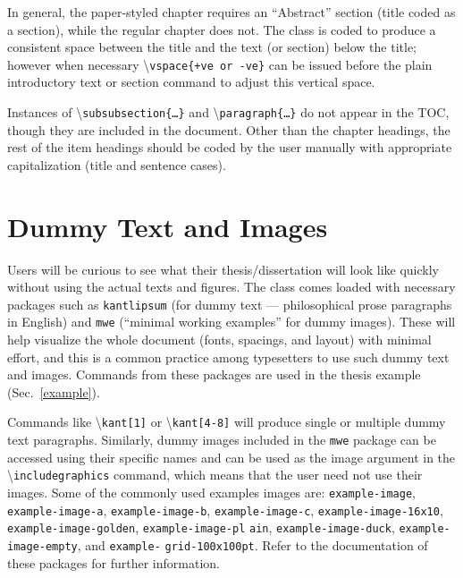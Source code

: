\documentclass{article}
\newcommand\cmd[1]{\textbackslash\texttt{#1}}
\begin{document}
In general,  the paper-styled chapter requires an ``Abstract'' section (title coded as a section),  while the regular chapter does not.  The class is coded to produce a consistent space between the title and the text (or section) below the title; however when necessary \cmd{vspace\{+ve or -ve\}} can be issued before the plain introductory text or section command to adjust this vertical space.  

Instances of \cmd{subsubsection\{\ldots\}} and \cmd{paragraph\{\ldots\}} do not appear in the TOC, though they are included in the document.  Other than the chapter headings,  the rest of the item headings should be coded by the user manually with appropriate capitalization (title and sentence cases).

\section{Dummy Text and Images} 
Users will be curious to see what their thesis/dissertation will look like quickly without using the actual texts and figures. The class comes loaded with necessary packages such as \texttt{kantlipsum} (for dummy text --- philosophical prose paragraphs in English) and \texttt{mwe} (``minimal working examples'' for dummy images). These will help visualize the whole document (fonts, spacings, and layout) with minimal effort, and this is a common practice among typesetters to use such dummy text and images. Commands from these packages are used in the thesis example (Sec.~\ref{example}).

Commands like \cmd{kant[1]} or \cmd{kant[4-8]} will produce single or multiple dummy text paragraphs. Similarly, dummy images included in the \texttt{mwe} package can be accessed using their specific names and can be used as the image argument in the \cmd{includegraphics} command, which means that the user need not use their images. Some of the commonly used examples images are: \texttt{example-image}, \texttt{example-image-a}, \texttt{example-image-b}, \texttt{example-image-c}, \texttt{example-image-16x10}, \texttt{example-image-golden}, \texttt{example-image-pl} \texttt{ain}, \texttt{example-image-duck}, \texttt{example-image-empty}, and \texttt{example-} \texttt{grid-100x100pt}. Refer to the documentation of these packages for further information.
\end{document}
